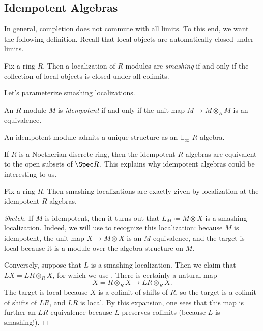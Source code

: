 \documentclass[../notes.tex]{subfiles}
\begin{document}
\subsection{Idempotent Algebras}
In general, completion does not commute with all limits. To this end, we want the following definition. Recall that local objects are automatically closed under limits.
\begin{definition}[smashing]
	Fix a ring $R$. Then a localization of $R$-modules are \textit{smashing} if and only if the collection of local objects is closed under all colimits.
\end{definition}
Let's parameterize smashing localizations.
\begin{definition}[idempotent]
	An $R$-module $M$ is \textit{idempotent} if and only if the unit map $M\to M\otimes_RM$ is an equivalence.
\end{definition}
\begin{remark}
	An idempotent module admits a unique structure as an $\mathbb E_\infty$-$R$-algebra.
\end{remark}
\begin{remark}
	If $R$ is a Noetherian discrete ring, then the idempotent $R$-algebras are equivalent to the open subsets of $\Spec R$. This explains why idempotent algebras could be interesting to us.
\end{remark}
\begin{proposition}
	Fix a ring $R$. Then smashing localizations are exactly given by localization at the idempotent $R$-algebras.
\end{proposition}
\begin{proof}[Sketch]
	If $M$ is idempotent, then it turns out that $L_M\coloneqq M\otimes X$ is a smashing localization. Indeed, we will use  to recognize this localization: because $M$ is idempotent, the unit map $X\to M\otimes X$ is an $M$-equivalence, and the target is local because it is a module over the algebra structure on $M$.

	Conversely, suppose that $L$ is a smashing localization. Then we claim that $LX=LR\otimes_RX$, for which we use . There is certainly a natural map
	\[X=R\otimes_RX\to LR\otimes_RX.\]
	The target is local because $X$ is a colimit of shifts of $R$, so the target is a colimit of shifts of $LR$, and $LR$ is local. By this expansion, one sees that this map is further an $LR$-equivalence because $L$ preserves colimits (because $L$ is smashing!).
\end{proof}
\end{document}
